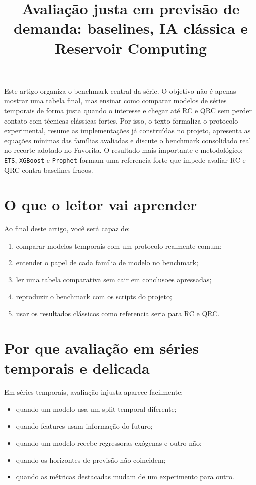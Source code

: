\documentclass[12pt]{article}
\title{Avaliação justa em previsão de demanda: baselines, IA clássica e Reservoir Computing}
\author{}
\providecommand{\tightlist}{%
          \setlength{\itemsep}{0pt}\setlength{\parskip}{0pt}}
\begin{document}
        \maketitle

        \begin{resumo}
        Este artigo organiza o benchmark central da série. O objetivo não é apenas mostrar uma tabela final, mas ensinar como comparar modelos de séries temporais de forma justa quando o interesse e chegar até RC e QRC sem perder contato com técnicas clássicas fortes. Por isso, o texto formaliza o protocolo experimental, resume as implementações já construídas no projeto, apresenta as equações mínimas das famílias avaliadas e discute o benchmark consolidado real no recorte adotado no Favorita. O resultado mais importante e metodológico: \texttt{ETS}, \texttt{XGBoost} e \texttt{Prophet} formam uma referencia forte que impede avaliar RC e QRC contra baselines fracos.
        \end{resumo}

        \section{O que o leitor vai aprender}\label{1-o-que-o-leitor-vai-aprender}

Ao final deste artigo, você será capaz de:

\begin{enumerate}
\def\labelenumi{\arabic{enumi}.}
\tightlist
\item
  comparar modelos temporais com um protocolo realmente comum;
\item
  entender o papel de cada família de modelo no benchmark;
\item
  ler uma tabela comparativa sem cair em conclusoes apressadas;
\item
  reproduzir o benchmark com os scripts do projeto;
\item
  usar os resultados clássicos como referencia seria para RC e QRC.
\end{enumerate}

\section{Por que avaliação em séries temporais e delicada}\label{2-por-que-avaliauxe7uxe3o-em-suxe9ries-temporais-e-delicada}

Em séries temporais, avaliação injusta aparece facilmente:

\begin{itemize}
\tightlist
\item
  quando um modelo usa um split temporal diferente;
\item
  quando features usam informação do futuro;
\item
  quando um modelo recebe regressoras exógenas e outro não;
\item
  quando os horizontes de previsão não coincidem;
\item
  quando as métricas destacadas mudam de um experimento para outro.
\end{itemize}
\end{document}
